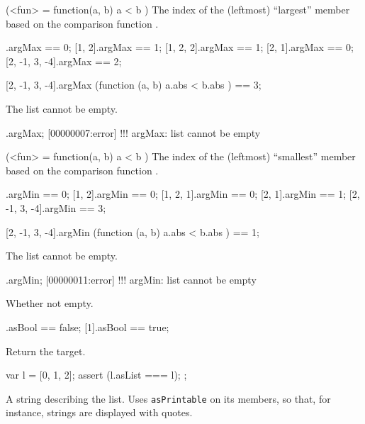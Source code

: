 \begin{urbiscriptapi}
\item[argMax](<fun> = function(a, b) { a < b })%
  The index of the (leftmost) ``largest'' member based on the comparison
  function .
\begin{urbiassert}
           [1].argMax == 0;
        [1, 2].argMax == 1;
     [1, 2, 2].argMax == 1;
        [2, 1].argMax == 0;
[2, -1, 3, -4].argMax == 2;

[2, -1, 3, -4].argMax (function (a, b) { a.abs < b.abs }) == 3;
\end{urbiassert}

The list cannot be empty.

\begin{urbiscript}
[].argMax;
[00000007:error] !!! argMax: list cannot be empty
\end{urbiscript}


\item[argMin](<fun> = function(a, b) { a < b })%
  The index of the (leftmost) ``smallest'' member based on the comparison
  function .
\begin{urbiassert}
           [1].argMin == 0;
        [1, 2].argMin == 0;
     [1, 2, 1].argMin == 0;
        [2, 1].argMin == 1;
[2, -1, 3, -4].argMin == 3;

[2, -1, 3, -4].argMin (function (a, b) { a.abs < b.abs }) == 1;
\end{urbiassert}

The list cannot be empty.

\begin{urbiscript}
[].argMin;
[00000011:error] !!! argMin: list cannot be empty
\end{urbiscript}

\item[asBool]
  Whether not empty.
\begin{urbiassert}
[].asBool == false;
[1].asBool == true;
\end{urbiassert}

\item[asList]
  Return the target.

\begin{urbiscript}
{
  var l = [0, 1, 2];
  assert (l.asList === l);
};
\end{urbiscript}

\item[asString]
  A string describing the list.  Uses \lstinline|asPrintable| on its
  members, so that, for instance, strings are displayed with quotes.


\end{urbiscriptapi}
